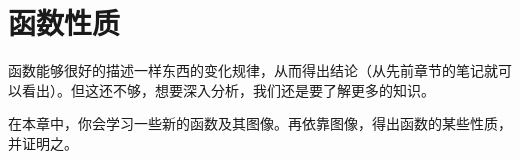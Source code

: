 \chapter{函数性质}
函数能够很好的描述一样东西的变化规律，从而得出结论（从先前章节的笔记就可以看出）。但这还不够，想要深入分析，我们还是要了解更多的知识。

在本章中，你会学习一些新的函数及其图像。再依靠图像，得出函数的某些性质，并证明之。




